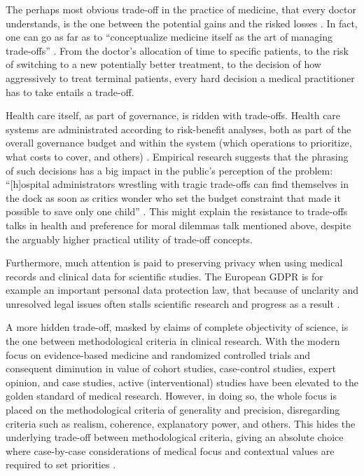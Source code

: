     The perhaps most obvious trade-off in the practice of medicine, that every doctor understands, is the one between the potential gains and the risked losses \cite{Launer2020}.
    In fact, one can go as far as to ``conceptualize medicine itself as the art of managing trade-offs'' \cite{Launer2020}.
    From the doctor's allocation of time to specific patients, to the risk of switching to a new potentially better treatment, to the decision of how aggressively to treat terminal patients, every hard decision a medical practitioner has to take entails a trade-off.

    Health care itself, as part of governance, is ridden with trade-offs.
    Health care systems are administrated according to risk-benefit analyses, both as part of the overall governance budget and within the system (which operations to prioritize, what costs to cover, and others) \cite{Dionne2018}.
    Empirical research suggests that the phrasing of such decisions has a big impact in the public's perception of the problem:
    ``[h]ospital administrators wrestling with tragic trade-offs can find themselves in the dock as soon as critics wonder who set the budget constraint that made it possible to save only one child'' \cite[p.~323]{Tetlock2003}.
    This might explain the resistance to trade-offs talks in health and preference for moral dilemmas talk mentioned above, despite the arguably higher practical utility of trade-off concepts.

    Furthermore, much attention is paid to preserving privacy when using medical records and clinical data for scientific studies.
    The European GDPR is for example an important personal data protection law, that because of unclarity and unresolved legal issues often stalls scientific research and progress as a result \cite{Eiss2020}.

    A more hidden trade-off, masked by claims of complete objectivity of science, is the one between methodological criteria in clinical research.
    With the modern focus on evidence-based medicine and randomized controlled trials and consequent diminution in value of cohort studies, case-control studies, expert opinion, and case studies, active (interventional) studies have been elevated to the golden standard of medical research.
    However, in doing so, the whole focus is placed on the methodological criteria of generality and precision, disregarding criteria such as realism, coherence, explanatory power, and others.
    This hides the underlying trade-off between methodological criteria, giving an absolute choice where case-by-case considerations of medical focus and contextual values are required to set priorities \cite{Ho2011}.

